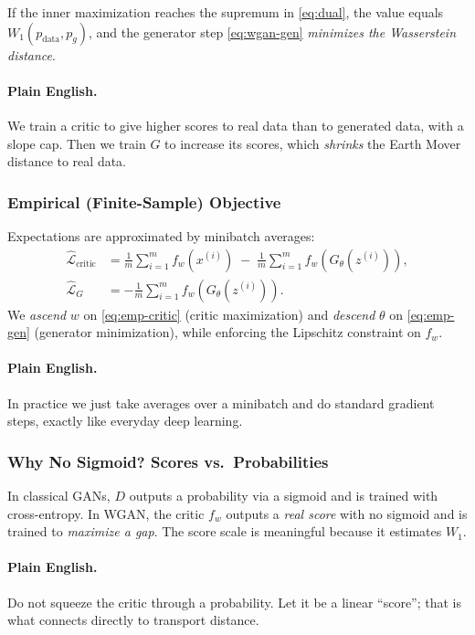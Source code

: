 \documentclass[11pt]{article}
\theoremstyle{remark}
\begin{document}
If the inner maximization reaches the supremum in \eqref{eq:dual}, the value equals $W_1(p_{\text{data}},p_g)$, and the generator step \eqref{eq:wgan-gen} \emph{minimizes the Wasserstein distance}.

\paragraph{Plain English.}
We train a critic to give higher scores to real data than to generated data, with a slope cap. Then we train $G$ to increase its scores, which \emph{shrinks} the Earth Mover distance to real data.

\subsubsection{Empirical (Finite-Sample) Objective}
Expectations are approximated by minibatch averages:
\begin{align}
\widehat{\mathcal{L}}_{\text{critic}}
&= \frac{1}{m}\sum_{i=1}^m f_w(x^{(i)}) \;-\; \frac{1}{m}\sum_{i=1}^m f_w(G_\theta(z^{(i)})),
\label{eq:emp-critic}\\
\widehat{\mathcal{L}}_{G}
&= - \frac{1}{m}\sum_{i=1}^m f_w(G_\theta(z^{(i)})).
\label{eq:emp-gen}
\end{align}
We \emph{ascend} $w$ on \eqref{eq:emp-critic} (critic maximization) and \emph{descend} $\theta$ on \eqref{eq:emp-gen} (generator minimization), while enforcing the Lipschitz constraint on $f_w$.

\paragraph{Plain English.}
In practice we just take averages over a minibatch and do standard gradient steps, exactly like everyday deep learning.

\subsubsection{Why No Sigmoid? Scores vs.\ Probabilities}
In classical GANs, $D$ outputs a probability via a sigmoid and is trained with cross-entropy. In WGAN, the critic $f_w$ outputs a \emph{real score} with no sigmoid and is trained to \emph{maximize a gap}. The score scale is meaningful because it estimates $W_1$.

\paragraph{Plain English.}
Do not squeeze the critic through a probability. Let it be a linear ``score''; that is what connects directly to transport distance.
\end{document}
